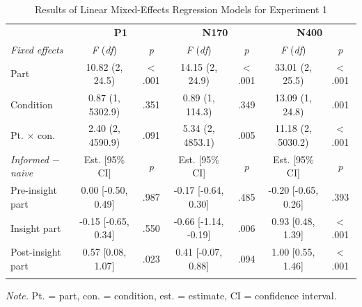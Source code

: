 \documentclass[
  english,
  man,floatsintext]{apa7}
\begin{document}
\begin{table}[tbp]

\begin{center}
\begin{threeparttable}

\caption{\label{tab:exp1-table}Results of Linear Mixed-Effects Regression Models for Experiment 1\smallskip}

\footnotesize{

\begin{tabular}{lcccccc}
\toprule
 & \multicolumn{2}{c}{\textbf{P1}} & \multicolumn{2}{c}{\textbf{N170}} & \multicolumn{2}{c}{\textbf{N400}} \\
\cmidrule(r){2-3} \cmidrule(r){4-5} \cmidrule(r){6-7}
\textit{Fixed effects} & \textit{F} (\textit{df}) & \textit{p} & \textit{F} (\textit{df}) & \textit{p} & \textit{F} (\textit{df}) & \textit{p}\\
\midrule
Part & 10.82 (2, 24.5) & < .001 & 14.15 (2, 24.9) & < .001 & 33.01 (2, 25.5) & < .001\\
Condition & 0.87 (1, 5302.9) & .351 & 0.89 (1, 114.3) & .349 & 13.09 (1, 24.8) & .001\\
Pt. × con. & 2.40 (2, 4590.9) & .091 & 5.34 (2, 4853.1) & .005 & 11.18 (2, 5030.2) & < .001\\
\textit{Informed $-$  naive} & Est. [95\% CI] & \textit{p} & Est. [95\% CI] & \textit{p} & Est. [95\% CI] & \textit{p}\\ \midrule
Pre-insight part & 0.00 [-0.50, 0.49] & .987 & -0.17 [-0.64, 0.30] & .485 & -0.20 [-0.65, 0.26] & .393\\
Insight part & -0.15 [-0.65, 0.34] & .550 & -0.66 [-1.14, -0.19] & .006 & 0.93 [0.48, 1.39] & < .001\\
Post-insight part & 0.57 [0.08, 1.07] & .023 & 0.41 [-0.07, 0.88] & .094 & 1.00 [0.55, 1.46] & < .001\\
\bottomrule
\addlinespace
\end{tabular}

}

\begin{tablenotes}[para]
\normalsize{\textit{Note.} Pt. = part, con. = condition, est. = estimate, CI = confidence interval.}
\end{tablenotes}

\end{threeparttable}
\end{center}

\end{table}
\end{document}
